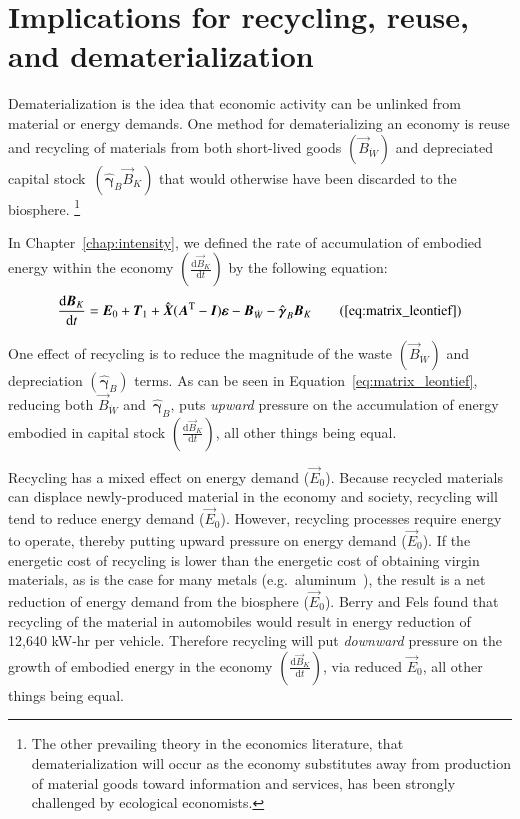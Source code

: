 \section{Implications for recycling, reuse, and dematerialization}
\label{sec:recycling}

Dematerialization is the idea that economic activity can be unlinked 
from material or energy demands.\cite{FischerKowalski:2011uo} 
One method for dematerializing an economy 
is reuse and recycling of materials
from both short-lived goods
$\left(\vec{B}_{\dot{W}}\right)$
and depreciated
capital stock~$\left(\hat{\boldsymbol{\gamma}}_{B}\vec{B}_{K}\right)$
that would otherwise have
been discarded to the biosphere.%
	\footnote{
	The other prevailing theory in the economics literature, that
	dematerialization will occur as the economy substitutes away 
	from production of material goods 
	toward information and services, has been strongly challenged 
	by ecological economists.\cite{Bartelmus:2003vi,parrinello2004service}
	}

In Chapter~\ref{chap:intensity},
we defined the rate of accumulation 
of embodied energy within the economy
$\left(\frac{\mathrm{d}\vec{B}_{K}}{\mathrm{d}t}\right)$
by the following equation:
%
\begin{equation}
	\frac{\mathrm{d}\vec{B}_{K}}{\mathrm{d}t} 
	= \vec{E}_{0}
	+ \vec{T}_{1}
	+ \hat{\vec{X}} (\vec{A}^{\mathrm{T}} - \vec{I})\boldsymbol{\varepsilon} 
	- \vec{B}_{\dot{W}}
	- \hat{\boldsymbol{\gamma}}_{B}\vec{B}_{K}\tag{\ref{eq:matrix_leontief}}
\end{equation}

One effect of recycling is to reduce the magnitude 
of the waste 
$\left(\vec{B}_{\dot{W}}\right)$
and depreciation 
$\left(\hat{\boldsymbol{\gamma}}_{B}\right)$ terms.
As can be seen in Equation~\ref{eq:matrix_leontief},
reducing both $\vec{B}_{\dot{W}}$ 
and~$\hat{\boldsymbol{\gamma}}_{B}$, 
puts \emph{upward} pressure on the accumulation of 
energy embodied in capital stock
$\left(\frac{\mathrm{d}\vec{B}_{K}}{\mathrm{d}t}\right)$,
all other things being equal.

Recycling has a mixed effect on energy demand ($\vec{E}_{0}$). 
Because recycled materials can displace newly-produced material 
in the economy and society, 
recycling will tend to reduce energy demand ($\vec{E}_{0}$). 
However, recycling processes require energy to operate, 
thereby putting upward pressure on energy demand ($\vec{E}_{0}$). 
If the energetic cost of recycling is lower than 
the energetic cost of obtaining virgin materials, 
as is the case for many metals
(e.g.\ aluminum~\cite{Chapman1975}), 
the result is a net reduction of energy demand 
from the biosphere ($\vec{E}_{0}$). 
Berry and Fels found that recycling of the material in automobiles
would result in energy reduction of 12,640 kW-hr per vehicle.\cite[p.~15]{Berry:1973vo}
Therefore recycling will put \emph{downward} pressure on 
the growth of embodied energy in the economy
$\left(\frac{\mathrm{d}\vec{B}_{K}}{\mathrm{d}t}\right)$,
via reduced $\vec{E}_{0}$, all other things being equal. 

